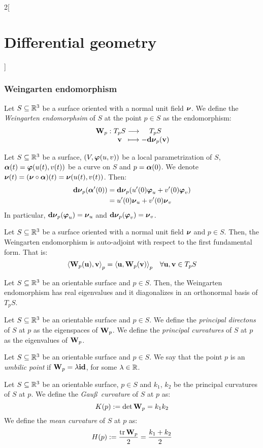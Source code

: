 \documentclass[../../../main.tex]{subfiles}
\begin{document}
\begin{multicols}{2}[\section{Differential geometry}]
  \subsubsection{Weingarten endomorphism}
  \begin{definition}
    Let $S\subseteq\mathbb{R}^3$ be a surface oriented with a normal unit field $\boldsymbol{\mathrm{\nu}}$. We define the \emph{Weingarten endomorphsim} of $S$ at the point $p\in S$ as the endomorphism: $$\function{\vf{W}_p}{T_pS}{T_pS}{\vf{v}}{-\vf{\dd{\nu}}_p(\vf{v})}$$
  \end{definition}
  \begin{lemma}
    Let $S\subseteq\mathbb{R}^3$ be a surface, $(V,\boldsymbol{\mathrm{\varphi}}(u,v))$ be a local parametrization of $S$, $\boldsymbol{\mathrm{\alpha}}(t)=\boldsymbol{\mathrm{\varphi}}(u(t),v(t))$ be a curve on $S$ and $p=\boldsymbol{\mathrm{\alpha}}(0)$. We denote $\boldsymbol{\mathrm{\nu}}(t)=(\boldsymbol{\mathrm{\nu}}\circ\boldsymbol{\mathrm{\alpha}})(t)=\boldsymbol{\mathrm{\nu}}(u(t),v(t))$. Then:
    \begin{align*}
      \boldsymbol{\mathrm{\dd{\nu}}}_p(\boldsymbol{\mathrm{\alpha}}'(0)) & =\boldsymbol{\mathrm{\dd{\nu}}}_p(u'(0)\boldsymbol{\mathrm{\varphi}}_u+v'(0)\boldsymbol{\mathrm{\varphi}}_v) \\
                                     & =u'(0)\boldsymbol{\mathrm{\nu}}_u+v'(0)\boldsymbol{\mathrm{\nu}}_v
    \end{align*}
    In particular, $\boldsymbol{\mathrm{\dd{\nu}}}_p(\boldsymbol{\mathrm{\varphi}}_u)=\boldsymbol{\mathrm{\nu}}_u$ and $\boldsymbol{\mathrm{\dd{\nu}}}_p(\boldsymbol{\mathrm{\varphi}}_v)=\boldsymbol{\mathrm{\nu}}_v$.
  \end{lemma}
  \begin{proposition}
    Let $S\subseteq\mathbb{R}^3$ be a surface oriented with a normal unit field $\boldsymbol{\mathrm{\nu}}$ and $p\in S$. Then, the Weingarten endomorphism is auto-adjoint with respect to the first fundamental form. That is: $${\langle \boldsymbol{\mathrm{W}}_p(\boldsymbol{\mathrm{u}}),\boldsymbol{\mathrm{v}}\rangle}_p={\langle \boldsymbol{\mathrm{u}},\boldsymbol{\mathrm{W}}_p(\boldsymbol{\mathrm{v}})\rangle}_p\quad\forall\boldsymbol{\mathrm{u}},\boldsymbol{\mathrm{v}}\in T_pS$$
  \end{proposition}
  \begin{proposition}
    Let $S\subseteq\mathbb{R}^3$ be an orientable surface and $p\in S$. Then, the Weingarten endomorphism has real eigenvalues and it diagonalizes in an orthonormal basis of $T_pS$.
  \end{proposition}
  \begin{definition}
    Let $S\subseteq\mathbb{R}^3$ be an orientable surface and $p\in S$. We define the \emph{principal directons} of $S$ at $p$ as the eigenspaces of $\boldsymbol{\mathrm{W}}_p$. We define the \emph{principal curvatures} of $S$ at $p$ as the eigenvalues of $\boldsymbol{\mathrm{W}}_p$.
  \end{definition}
  \begin{definition}
    Let $S\subseteq\mathbb{R}^3$ be an orientable surface and $p\in S$. We say that the point $p$ is an \emph{umbilic point} if $\boldsymbol{\mathrm{W}}_p=\lambda \boldsymbol{\mathrm{id}}$, for some $\lambda\in\mathbb{R}$.
  \end{definition}
  \begin{definition}
    Let $S\subseteq\mathbb{R}^3$ be an orientable surface, $p\in S$ and $k_1$, $k_2$ be the principal curvatures of $S$ at $p$. We define the \emph{Gau\ss\ curvature} of $S$ at $p$ as:
    $$K(p):=\det\boldsymbol{\mathrm{W}}_p=k_1k_2$$
    We define the \emph{mean curvature} of $S$ at $p$ as:
    $$H(p):=\frac{\trace\vf{W}_p}{2}=\frac{k_1+k_2}{2}$$
  \end{definition}

\end{multicols}
\end{document}
